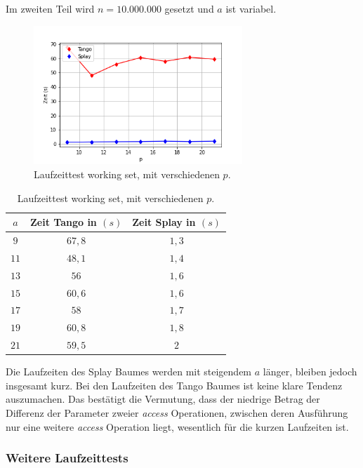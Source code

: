 \documentclass[a4paper,12pt]{article}
\begin{document}
\noindent Im zweiten Teil wird $n = 10.000.000$ gesetzt und $a$ ist variabel. 
\begin{figure}[H]
	\centering
	\includegraphics[width=0.7\textwidth]{Medien/laufzeittest/diagramm/workingset2}
	\caption{Laufzeittest working set, mit verschiedenen $p$.}
\end{figure}
\begin{table}[H]
	\begin{center}
		\begin{tabular}[c]{|c|c|c|}
			\hline
			$a$ & Zeit Tango in $\left(s\right)$ &Zeit Splay in $\left(s\right)$ \\
			\hline
			$9$  & $67,8$ &$1,3$  \\
			\hline
			$11$  & $48,1$ &$1,4$  \\
			\hline
		    $13$  & $56$ &$1,6$  \\
			\hline
			$15$  & $60,6$ &$1,6$  \\
			\hline
			$17$  & $58$ &$1,7$  \\
			\hline
			$19$  & $60,8$ &$1,8$  \\
			\hline
			$21$  & $59,5$ &$2$  \\
			\hline
		\end{tabular}
		\caption{Laufzeittest working set, mit verschiedenen $p$.} 
	\end{center}
\end{table}


\noindent Die Laufzeiten des Splay Baumes werden mit steigendem $a$ länger, bleiben jedoch insgesamt kurz. Bei den Laufzeiten des Tango Baumes ist keine klare Tendenz auszumachen. Das bestätigt die Vermutung, dass der niedrige Betrag der Differenz der Parameter zweier \textit{access} Operationen, zwischen deren Ausführung nur eine weitere \textit{access} Operation liegt, wesentlich für die kurzen Laufzeiten ist.     
\newpage
\subsubsection{Weitere Laufzeittests}
\end{document}
